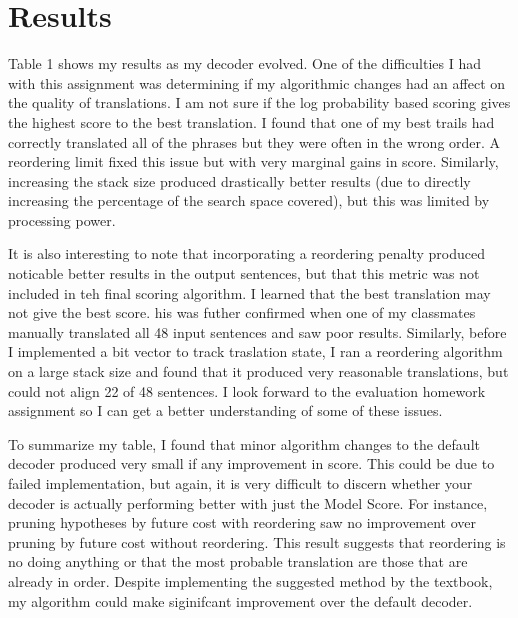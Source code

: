 \documentclass{article}
\begin{document}
\section{Results}
\par
Table 1 shows my results as my decoder evolved. One of the difficulties I had with this assignment was determining if my algorithmic changes had an affect on the quality of translations. I am not sure if the log probability based scoring gives the highest score to the best translation. I found that one of my best trails had correctly translated all of the phrases but they were often in the wrong order. A reordering limit fixed this issue but with very marginal gains in score. Similarly, increasing the stack size produced drastically better results (due to directly increasing the percentage of the search space covered), but this was limited by processing power. 
\par
It is also interesting to note that incorporating a reordering penalty produced noticable better results in the output sentences, but that this metric was not included in teh final scoring algorithm. I learned that the best translation may not give the best score. his was futher confirmed when one of my classmates manually translated all 48 input sentences and saw poor results. Similarly, before I implemented a bit vector to track traslation state, I ran a reordering algorithm on a large stack size and found that it produced very reasonable translations, but could not align 22 of 48 sentences. I look forward to the evaluation homework assignment so I can get a better understanding of some of these issues.
\par
To summarize my table, I found that minor algorithm changes to the default decoder produced very small if any improvement in score. This could be due to failed implementation, but again, it is very difficult to discern whether your decoder is actually performing better with just the Model Score. For instance, pruning hypotheses by future cost with reordering saw no improvement over pruning by future cost without reordering. This result suggests that reordering is no doing anything or that the most probable translation are those that are already in order. Despite implementing the suggested method by the textbook, my algorithm could make siginifcant improvement over the default decoder. 
\end{document}
